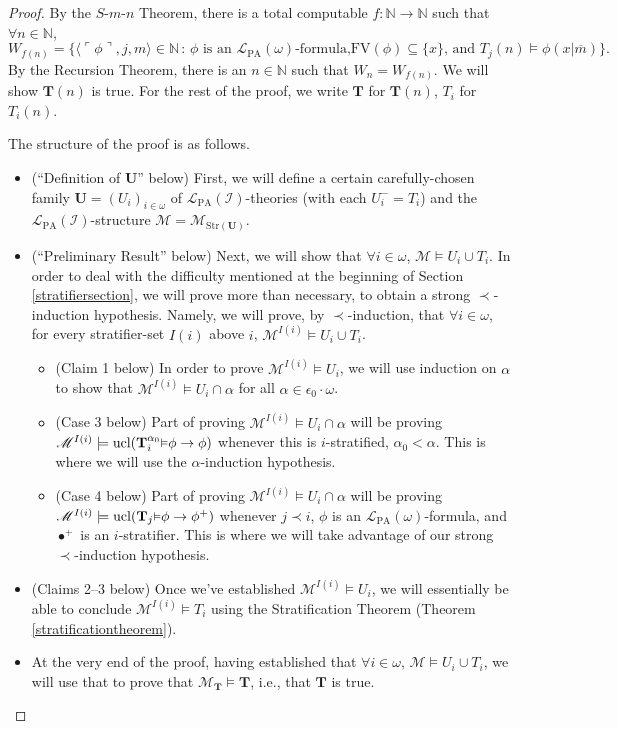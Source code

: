 \documentclass[reqno]{article}
\theoremstyle{definition}
\def\N{\mathbb{N}}
\def\L{\mathscr{L}}
\def\M{\mathscr{M}}
\def\T{\mathbf{T}}
\def\U{\mathbf{U}}
\def\FV{\mathrm{FV}}
\def\LPA{\L_{\mathrm{PA}}}
\def\epom{\epsilon_0\cdot\omega}
\def\indset{\mathcal I}
\renewcommand{\Pr}[1]{\T_{#1}\mbox{\small${\vDash}$}}
\newcommand{\Prr}[2]{\T^{#1}_{#2}\mbox{\small${\vDash}$}}
\newcommand{\ucl}[1]{\mathrm{ucl}(#1)}
\newcommand{\str}[1]{\mathrm{Str}(#1)} \newcommand{\Str}[1]{\str{#1}}
\begin{document}
\begin{proof}
By the $S$-$m$-$n$ Theorem, there is a total computable $f:\N\to\N$ such that $\forall n\in\N$,
\[
W_{f(n)}=\{\langle\ulcorner\phi\urcorner,j,m\rangle\in\N\,:\,\mbox{$\phi$ is an $\LPA(\omega)$-formula,
$\FV(\phi)\subseteq\{x\}$, and $T_j(n)\models\phi(x|\overline m)$}\}.
\]
By the Recursion Theorem, there is an $n\in\N$ such that $W_n=W_{f(n)}$.
We will show $\T(n)$ is true.
For the rest of the proof, we write $\T$ for $\T(n)$, $T_i$ for $T_i(n)$.

The structure of the proof is as follows.
\begin{itemize}
\item
(``Definition of $\U$'' below) First, we will define a certain
carefully-chosen family $\U=(U_i)_{i\in\omega}$ of $\LPA(\indset)$-theories
(with each $U^-_i=T_i$)
and the $\LPA(\indset)$-structure $\M=\M_{\str{\U}}$.
\item
(``Preliminary Result'' below)
Next, we will show that $\forall i\in\omega$, $\M\models U_i\cup T_i$.
In order to deal with the difficulty mentioned at
the beginning of Section \ref{stratifiersection},
we will prove more than necessary, to obtain a strong $\prec$-induction hypothesis.
Namely, we will prove, by $\prec$-induction, that $\forall i\in\omega$,
for every stratifier-set $I(i)$ above $i$,
$\M^{I(i)}\models U_i\cup T_i$.
    \begin{itemize}
    \item
    (Claim 1 below)
    In order to prove $\M^{I(i)}\models U_i$, we will
    use induction on $\alpha$ to show that $\M^{I(i)}\models U_i\cap\alpha$
    for all $\alpha\in\epom$.
    \item
    (Case 3 below)
    Part of proving $\M^{I(i)}\models U_i\cap\alpha$ will be proving
    $\M^{I(i)}\models\ucl{\Prr{\alpha_0} i\phi\rightarrow\phi}$
    whenever this is $i$-stratified, $\alpha_0<\alpha$.
    This is where we will use the $\alpha$-induction hypothesis.
    \item
    (Case 4 below)
    Part of proving $\M^{I(i)}\models U_i\cap\alpha$ will be proving
    $\M^{I(i)}\models\ucl{\Pr j\phi\rightarrow\phi^+}$
    whenever $j\prec i$, $\phi$ is an $\LPA(\omega)$-formula,
    and $\bullet^+$ is an $i$-stratifier. This is where we will take advantage
    of our strong $\prec$-induction hypothesis.
    \end{itemize}
\item
(Claims 2--3 below)
Once we've established $\M^{I(i)}\models U_i$, we will essentially
be able to conclude
$\M^{I(i)}\models T_i$ using the Stratification Theorem
(Theorem \ref{stratificationtheorem}).
\item
At the very end of the proof,
having established that $\forall i\in\omega$, $\M\models U_i\cup T_i$,
we will use that to prove that $\M_\T\models\T$, i.e., that $\T$ is true.
\end{itemize}


\end{proof}
\end{document}
